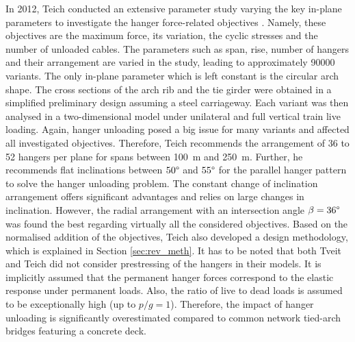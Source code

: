 In 2012, Teich conducted an extensive parameter study varying the key in-plane parameters to investigate the hanger force-related objectives \cite{Teich}. Namely, these objectives are the maximum force, its variation, the cyclic stresses and the number of unloaded cables.%
The parameters such as span, rise, number of hangers and their arrangement are varied in the study, leading to approximately \SI{90000}{} variants. The only in-plane parameter which is left constant is the circular arch shape. The cross sections of the arch rib and the tie girder were obtained in a simplified preliminary design assuming a steel carriageway. Each variant was then analysed in a two-dimensional model under unilateral and full vertical train live loading. 
Again, hanger unloading posed a big issue for many variants and affected all investigated objectives. Therefore, Teich recommends the arrangement of 36 to 52 hangers per plane for spans between \SI{100}{m} and \SI{250}{m}. Further, he recommends flat inclinations between $50\degree$ and $55\degree$ for the parallel hanger pattern to solve the hanger unloading problem. The constant change of inclination arrangement offers significant advantages and relies on large changes in inclination. However, the radial arrangement with an intersection angle $\beta=36\degree$ was found the best regarding virtually all the considered objectives. Based on the normalised addition of the objectives, Teich also developed a design methodology, which is explained in Section \ref{sec:rev_meth}. 
It has to be noted that both Tveit and Teich did not consider prestressing of the hangers in their models. It is implicitly assumed that the permanent hanger forces correspond to the elastic response under permanent loads. Also, the ratio of live to dead loads is assumed to be exceptionally high (up to $p/g=1$). Therefore, the impact of hanger unloading is significantly overestimated compared to common network tied-arch bridges featuring a concrete deck.

